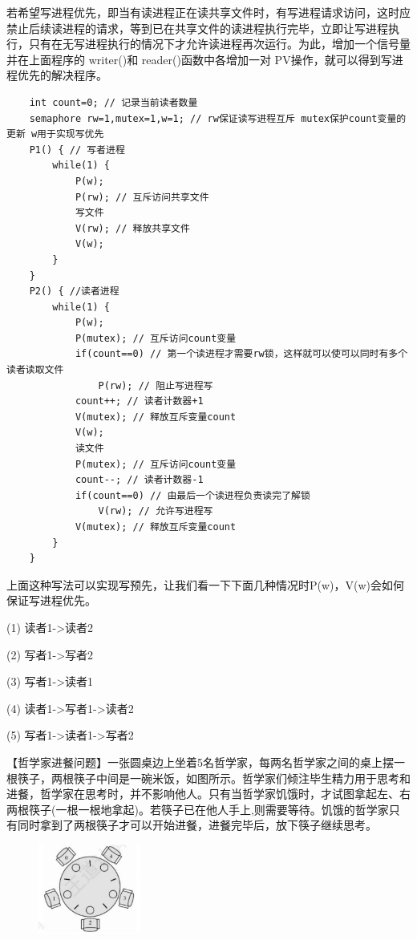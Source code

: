 \documentclass[lang=cn,10pt]{elegantbook}
\begin{document}
若希望写进程优先，即当有读进程正在读共享文件时，有写进程请求访问，这时应禁止后续读进程的请求，等到已在共享文件的读进程执行完毕，立即让写进程执行，只有在无写进程执行的情况下才允许读进程再次运行。为此，增加一个信号量并在上面程序的 writer()和 reader()函数中各增加一对 PV操作，就可以得到写进程优先的解决程序。

\begin{lstlisting}
    int count=0; // 记录当前读者数量
    semaphore rw=1,mutex=1,w=1; // rw保证读写进程互斥 mutex保护count变量的更新 w用于实现写优先
    P1() { // 写者进程
        while(1) {
            P(w);
            P(rw); // 互斥访问共享文件
            写文件
            V(rw); // 释放共享文件
            V(w);
        }
    }
    P2() { //读者进程
        while(1) {
            P(w);
            P(mutex); // 互斥访问count变量
            if(count==0) // 第一个读进程才需要rw锁，这样就可以使可以同时有多个读者读取文件
                P(rw); // 阻止写进程写
            count++; // 读者计数器+1
            V(mutex); // 释放互斥变量count
            V(w);
            读文件
            P(mutex); // 互斥访问count变量
            count--; // 读者计数器-1
            if(count==0) // 由最后一个读进程负责读完了解锁
                V(rw); // 允许写进程写
            V(mutex); // 释放互斥变量count
        }
    }
\end{lstlisting}

    上面这种写法可以实现写预先，让我们看一下下面几种情况时P(w)，V(w)会如何保证写进程优先。

    (1) 读者1->读者2

    (2) 写者1->写者2

    (3) 写者1->读者1

    (4) 读者1->写者1->读者2

    (5) 写者1->读者1->写者2

【哲学家进餐问题】一张圆桌边上坐着5名哲学家，每两名哲学家之间的桌上摆一根筷子，两根筷子中间是一碗米饭，如图所示。哲学家们倾注毕生精力用于思考和进餐，哲学家在思考时，并不影响他人。只有当哲学家饥饿时，才试图拿起左、右两根筷子(一根一根地拿起)。若筷子已在他人手上,则需要等待。饥饿的哲学家只有同时拿到了两根筷子才可以开始进餐，进餐完毕后，放下筷子继续思考。

\begin{figure}[h]
    \centering
\includegraphics[width=0.3\textwidth]{image/哲学家进餐问题.png}
\end{figure}
\end{document}
